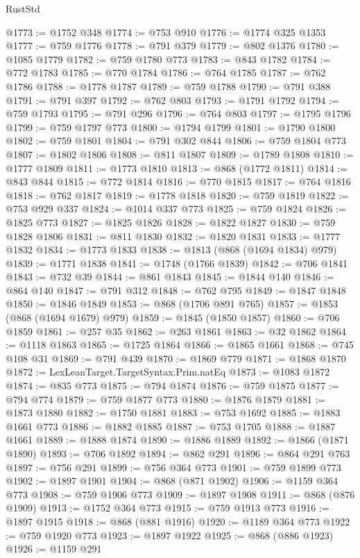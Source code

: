 \begin{lexlean}{RustStd}
\begin{coremodule}
@1773 := @1752 @348
@1774 := @753 @910
@1776 := @1774 @325 @1353
@1777 := @759 @1776
@1778 := @791 @379
@1779 := @802 @1376
@1780 := @1085 @1779
@1782 := @759 @1780 @773
@1783 := @843 @1782
@1784 := @772 @1783
@1785 := @770 @1784
@1786 := @764 @1785
@1787 := @762 @1786
@1788 := @1778 @1787
@1789 := @759 @1788
@1790 := @791 @388
@1791 := @791 @397
@1792 := @762 @803
@1793 := @1791 @1792
@1794 := @759 @1793
@1795 := @791 @296
@1796 := @764 @803
@1797 := @1795 @1796
@1799 := @759 @1797 @773
@1800 := @1794 @1799
@1801 := @1790 @1800
@1802 := @759 @1801
@1804 := @791 @302 @844
@1806 := @759 @1804 @773
@1807 := @1802 @1806
@1808 := @811 @1807
@1809 := @1789 @1808
@1810 := @1777 @1809
@1811 := @1773 @1810
@1813 := @868 (@1772 @1811)
@1814 := @843 @844
@1815 := @772 @1814
@1816 := @770 @1815
@1817 := @764 @1816
@1818 := @762 @1817
@1819 := @1778 @1818
@1820 := @759 @1819
@1822 := @753 @929 @337
@1824 := @1014 @337 @773
@1825 := @759 @1824
@1826 := @1825 @773
@1827 := @1825 @1826
@1828 := @1822 @1827
@1830 := @759 @1828 @1806
@1831 := @811 @1830
@1832 := @1820 @1831
@1833 := @1777 @1832
@1834 := @1773 @1833
@1838 := @1813 (@868 (@1694 @1834) @979)
@1839 := @1771 @1838
@1841 := @1748 (@1766 @1839)
@1842 := @706 @1841
@1843 := @732 @39
@1844 := @861 @1843
@1845 := @1844 @140
@1846 := @864 @140
@1847 := @791 @312
@1848 := @762 @795
@1849 := @1847 @1848
@1850 := @1846 @1849
@1853 := @868 (@1706 @891 @765)
@1857 := @1853 (@868 (@1694 @1679) @979)
@1859 := @1845 (@1850 @1857)
@1860 := @706 @1859
@1861 := @257 @35
@1862 := @263 @1861
@1863 := @32 @1862
@1864 := @1118 @1863
@1865 := @1725 @1864
@1866 := @1865 @1661
@1868 := @745 @108 @31
@1869 := @791 @439
@1870 := @1869 @779
@1871 := @1868 @1870
@1872 := LexLeanTarget.TargetSyntax.Prim.natEq
@1873 := @1083 @1872
@1874 := @835 @773
@1875 := @794 @1874
@1876 := @759 @1875
@1877 := @794 @774
@1879 := @759 @1877 @773
@1880 := @1876 @1879
@1881 := @1873 @1880
@1882 := @1750 @1881
@1883 := @753 @1692
@1885 := @1883 @1661 @773
@1886 := @1882 @1885
@1887 := @753 @1705
@1888 := @1887 @1661
@1889 := @1888 @1874
@1890 := @1886 @1889
@1892 := @1866 (@1871 @1890)
@1893 := @706 @1892
@1894 := @862 @291
@1896 := @864 @291 @763
@1897 := @756 @291
@1899 := @756 @364 @773
@1901 := @759 @1899 @773
@1902 := @1897 @1901
@1904 := @868 (@871 @1902)
@1906 := @1159 @364 @773
@1908 := @759 @1906 @773
@1909 := @1897 @1908
@1911 := @868 (@876 @1909)
@1913 := @1752 @364 @773
@1915 := @759 @1913 @773
@1916 := @1897 @1915
@1918 := @868 (@881 @1916)
@1920 := @1189 @364 @773
@1922 := @759 @1920 @773
@1923 := @1897 @1922
@1925 := @868 (@886 @1923)
@1926 := @1159 @291

\end{coremodule}
\end{lexlean}

